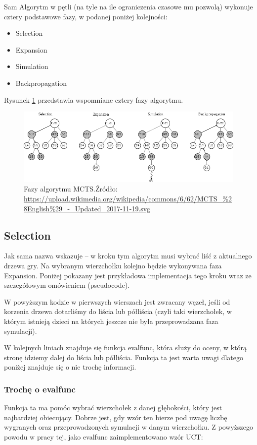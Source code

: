 \documentclass[polish,shortabstract,inz]{iithesis}
\begin{document}
Sam Algorytm w pętli (na tyle na ile ograniczenia czasowe mu pozwolą) wykonuje cztery podstawowe fazy, w podanej poniżej kolejności:
\begin{itemize}
  \item Selection
  \item Expansion
  \item Simulation
  \item Backpropagation
\end{itemize}
Rysunek \ref{fig:mcts} przedstawia wspomniane cztery fazy algorytmu.

\begin{figure}[H]
  \includegraphics[scale=0.4]{./images/mcts.png}
  \centering
  \caption{Fazy algorytmu MCTS.\newline Źródło:\,\url{https://upload.wikimedia.org/wikipedia/commons/6/62/MCTS\_\%28English\%29\_-\_Updated\_2017-11-19.svg}}
  \label{fig:mcts}
\end{figure}


\subsection{Selection}
Jak sama nazwa wskazuje -- w kroku tym algorytm musi wybrać liść z aktualnego drzewa gry.
Na wybranym wierzchołku kolejno będzie wykonywana faza Expansion.
Poniżej pokazany jest przykładowa implementacja tego kroku wraz ze szczegółowym omówieniem (pseudocode).



W powyższym kodzie w pierwszych wierszach jest zwracany węzeł, jeśli od korzenia drzewa dotarliśmy do liścia lub półliścia (czyli taki wierzchołek, w którym istnieją dzieci na których jeszcze nie była przeprowadzana faza symulacji).

W kolejnych liniach znajduje się funkcja eval\textunderscore func, która służy do oceny, w którą stronę idziemy dalej do liścia lub półliścia.
Funkcja ta jest warta uwagi dlatego poniżej znajduje się o nie trochę informacji.

\subsubsection{Trochę o eval\textunderscore func}
Funkcja ta ma pomóc wybrać wierzchołek z danej głębokości, który jest najbardziej obiecujący.
Dobrze jest, gdy wzór ten bierze pod uwagę liczbę wygranych oraz przeprowadzonych symulacji w danym wierzchołku.
Z powyższego powodu w pracy tej, jako eval\textunderscore func zaimplementowano wzór UCT:
\end{document}
